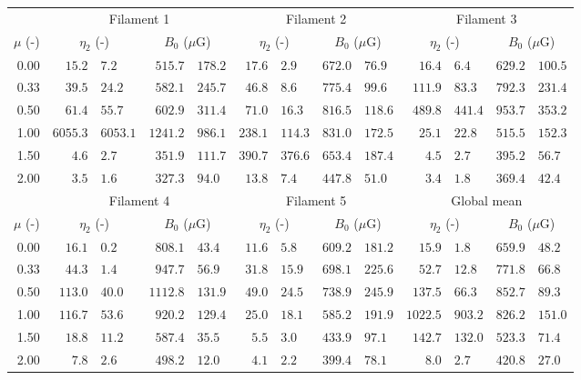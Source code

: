 \begin{tabular}{@{}rr@{ $\pm$ }lr@{ $\pm$ }lr@{ $\pm$ }lr@{ $\pm$ }lr@{ $\pm$ }lr@{ $\pm$ }l@{}}
\toprule
{} & \multicolumn{4}{c}{Filament 1}
   & \multicolumn{4}{c}{Filament 2}
   & \multicolumn{4}{c}{Filament 3} \\
\cmidrule(lr){2-5} \cmidrule(lr){6-9} \cmidrule(lr){10-13}
$\mu$ (-) & \multicolumn{2}{c}{$\eta_2$ (-)} & \multicolumn{2}{c}{$B_0$ ($\mu$G)}
          & \multicolumn{2}{c}{$\eta_2$ (-)} & \multicolumn{2}{c}{$B_0$ ($\mu$G)}
          & \multicolumn{2}{c}{$\eta_2$ (-)} & \multicolumn{2}{c}{$B_0$ ($\mu$G)} \\
\cmidrule{1-13}
0.00 & $15.2$ & $7.2$ & $515.7$ & $178.2$
     & $17.6$ & $2.9$ & $672.0$ & $76.9$
     & $16.4$ & $6.4$ & $629.2$ & $100.5$ \\
0.33 & $39.5$ & $24.2$ & $582.1$ & $245.7$
     & $46.8$ & $8.6$ & $775.4$ & $99.6$
     & $111.9$ & $83.3$ & $792.3$ & $231.4$ \\
0.50 & $61.4$ & $55.7$ & $602.9$ & $311.4$
     & $71.0$ & $16.3$ & $816.5$ & $118.6$
     & $489.8$ & $441.4$ & $953.7$ & $353.2$ \\
1.00 & $6055.3$ & $6053.1$ & $1241.2$ & $986.1$
     & $238.1$ & $114.3$ & $831.0$ & $172.5$
     & $25.1$ & $22.8$ & $515.5$ & $152.3$ \\
1.50 & $4.6$ & $2.7$ & $351.9$ & $111.7$
     & $390.7$ & $376.6$ & $653.4$ & $187.4$
     & $4.5$ & $2.7$ & $395.2$ & $56.7$ \\
2.00 & $3.5$ & $1.6$ & $327.3$ & $94.0$
     & $13.8$ & $7.4$ & $447.8$ & $51.0$
     & $3.4$ & $1.8$ & $369.4$ & $42.4$ \\

\midrule
{} & \multicolumn{4}{c}{Filament 4}
   & \multicolumn{4}{c}{Filament 5}
   & \multicolumn{4}{c}{Global mean} \\
\cmidrule(lr){2-5} \cmidrule(lr){6-9} \cmidrule(lr){10-13}
$\mu$ (-) & \multicolumn{2}{c}{$\eta_2$ (-)} & \multicolumn{2}{c}{$B_0$ ($\mu$G)}
          & \multicolumn{2}{c}{$\eta_2$ (-)} & \multicolumn{2}{c}{$B_0$ ($\mu$G)}
          & \multicolumn{2}{c}{$\eta_2$ (-)} & \multicolumn{2}{c}{$B_0$ ($\mu$G)} \\
\cmidrule{1-13}
0.00 & $16.1$ & $0.2$ & $808.1$ & $43.4$
     & $11.6$ & $5.8$ & $609.2$ & $181.2$
     & $15.9$ & $1.8$ & $659.9$ & $48.2$ \\
0.33 & $44.3$ & $1.4$ & $947.7$ & $56.9$
     & $31.8$ & $15.9$ & $698.1$ & $225.6$
     & $52.7$ & $12.8$ & $771.8$ & $66.8$ \\
0.50 & $113.0$ & $40.0$ & $1112.8$ & $131.9$
     & $49.0$ & $24.5$ & $738.9$ & $245.9$
     & $137.5$ & $66.3$ & $852.7$ & $89.3$ \\
1.00 & $116.7$ & $53.6$ & $920.2$ & $129.4$
     & $25.0$ & $18.1$ & $585.2$ & $191.9$
     & $1022.5$ & $903.2$ & $826.2$ & $151.0$ \\
1.50 & $18.8$ & $11.2$ & $587.4$ & $35.5$
     & $5.5$ & $3.0$ & $433.9$ & $97.1$
     & $142.7$ & $132.0$ & $523.3$ & $71.4$ \\
2.00 & $7.8$ & $2.6$ & $498.2$ & $12.0$
     & $4.1$ & $2.2$ & $399.4$ & $78.1$
     & $8.0$ & $2.7$ & $420.8$ & $27.0$ \\
\bottomrule
\end{tabular}
